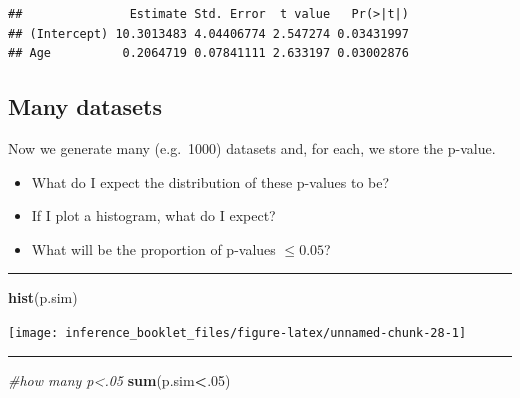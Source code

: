 \documentclass[]{article}
\newenvironment{Shaded}{\begin{snugshade}}{\end{snugshade}}
\newcommand{\CommentTok}[1]{\textcolor[rgb]{0.56,0.35,0.01}{\textit{#1}}}
\newcommand{\DecValTok}[1]{\textcolor[rgb]{0.00,0.00,0.81}{#1}}
\newcommand{\KeywordTok}[1]{\textcolor[rgb]{0.13,0.29,0.53}{\textbf{#1}}}
\newcommand{\NormalTok}[1]{#1}
\newcommand{\OperatorTok}[1]{\textcolor[rgb]{0.81,0.36,0.00}{\textbf{#1}}}
\providecommand{\tightlist}{%
  \setlength{\itemsep}{0pt}\setlength{\parskip}{0pt}}
\begin{document}
\begin{verbatim}
##               Estimate Std. Error  t value   Pr(>|t|)
## (Intercept) 10.3013483 4.04406774 2.547274 0.03431997
## Age          0.2064719 0.07841111 2.633197 0.03002876
\end{verbatim}

\hypertarget{many-datasets-1}{%
\subsection{Many datasets}\label{many-datasets-1}}

Now we generate many (e.g.~1000) datasets and, for each, we store the
p-value.

\begin{Shaded}
\end{Shaded}

\begin{itemize}
\tightlist
\item
  What do I expect the distribution of these p-values to be?
\item
  If I plot a histogram, what do I expect?
\item
  What will be the proportion of p-values \(\leq 0.05\)?
\end{itemize}

\begin{center}\rule{0.5\linewidth}{\linethickness}\end{center}

\begin{Shaded}
\begin{Highlighting}[]
\KeywordTok{hist}\NormalTok{(p.sim)}
\end{Highlighting}
\end{Shaded}

\begin{center}\texttt{[image: inference\_booklet\_files/figure-latex/unnamed-chunk-28-1]} \end{center}

\begin{center}\rule{0.5\linewidth}{\linethickness}\end{center}

\begin{Shaded}
\begin{Highlighting}[]
\CommentTok{#how many p<.05}
\KeywordTok{sum}\NormalTok{(p.sim}\OperatorTok{<}\NormalTok{.}\DecValTok{05}\NormalTok{)}
\end{Highlighting}
\end{Shaded}
\end{document}
